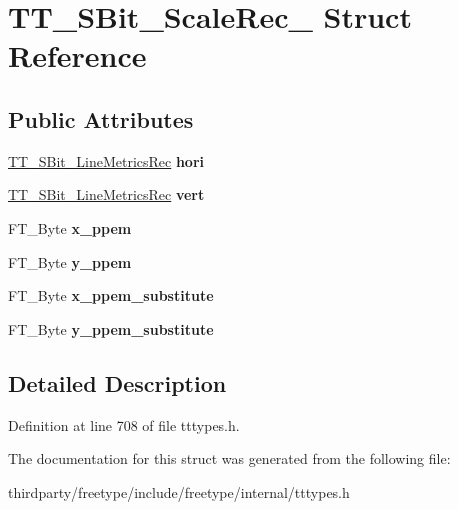 \hypertarget{struct_t_t___s_bit___scale_rec__}{}\section{T\+T\+\_\+\+S\+Bit\+\_\+\+Scale\+Rec\+\_\+ Struct Reference}
\label{struct_t_t___s_bit___scale_rec__}
\subsection*{Public Attributes}
\begin{DoxyCompactItemize}
\item 
\mbox{\label{struct_t_t___s_bit___scale_rec___a2a61bc97ebb7ed996170a03612ffbbc0}} 
\hyperlink{struct_t_t___s_bit___line_metrics_rec__}{T\+T\+\_\+\+S\+Bit\+\_\+\+Line\+Metrics\+Rec} {\bfseries hori}
\item 
\mbox{\label{struct_t_t___s_bit___scale_rec___acbf5c459602d9f52ac04a914e2f12375}} 
\hyperlink{struct_t_t___s_bit___line_metrics_rec__}{T\+T\+\_\+\+S\+Bit\+\_\+\+Line\+Metrics\+Rec} {\bfseries vert}
\item 
\mbox{\label{struct_t_t___s_bit___scale_rec___a235731b0452ea063cccacd2f59b3f44c}} 
F\+T\+\_\+\+Byte {\bfseries x\+\_\+ppem}
\item 
\mbox{\label{struct_t_t___s_bit___scale_rec___aa4c1fb419ea55c8c587ba81700c6ce66}} 
F\+T\+\_\+\+Byte {\bfseries y\+\_\+ppem}
\item 
\mbox{\label{struct_t_t___s_bit___scale_rec___a71955e363b0b5da84ed2c15d0e6f832d}} 
F\+T\+\_\+\+Byte {\bfseries x\+\_\+ppem\+\_\+substitute}
\item 
\mbox{\label{struct_t_t___s_bit___scale_rec___a3a9f554d0153f9e3022898c1f59a7b63}} 
F\+T\+\_\+\+Byte {\bfseries y\+\_\+ppem\+\_\+substitute}
\end{DoxyCompactItemize}


\subsection{Detailed Description}


Definition at line 708 of file tttypes.\+h.



The documentation for this struct was generated from the following file\+:\begin{DoxyCompactItemize}
\item 
thirdparty/freetype/include/freetype/internal/tttypes.\+h\end{DoxyCompactItemize}
